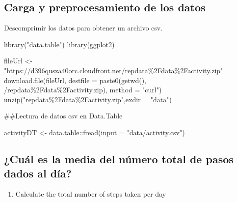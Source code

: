 \documentclass[
]{article}
\newenvironment{Shaded}{\begin{snugshade}}{\end{snugshade}}
\newcommand{\AttributeTok}[1]{\textcolor[rgb]{0.77,0.63,0.00}{#1}}
\newcommand{\FunctionTok}[1]{\textcolor[rgb]{0.00,0.00,0.00}{#1}}
\newcommand{\NormalTok}[1]{#1}
\newcommand{\OtherTok}[1]{\textcolor[rgb]{0.56,0.35,0.01}{#1}}
\newcommand{\SpecialCharTok}[1]{\textcolor[rgb]{0.00,0.00,0.00}{#1}}
\newcommand{\StringTok}[1]{\textcolor[rgb]{0.31,0.60,0.02}{#1}}
\providecommand{\tightlist}{%
  \setlength{\itemsep}{0pt}\setlength{\parskip}{0pt}}
\begin{document}
\hypertarget{carga-y-preprocesamiento-de-los-datos}{%
\subsection{Carga y preprocesamiento de los
datos}\label{carga-y-preprocesamiento-de-los-datos}}

Descomprimir los datos para obtener un archivo csv.

\begin{Shaded}
\begin{Highlighting}[]
\FunctionTok{library}\NormalTok{(}\StringTok{"data.table"}\NormalTok{)}
\FunctionTok{library}\NormalTok{(ggplot2)}

\NormalTok{fileUrl }\OtherTok{\textless{}{-}} \StringTok{"https://d396qusza40orc.cloudfront.net/repdata\%2Fdata\%2Factivity.zip"}
\FunctionTok{download.file}\NormalTok{(fileUrl, }\AttributeTok{destfile =} \FunctionTok{paste0}\NormalTok{(}\FunctionTok{getwd}\NormalTok{(), }\StringTok{\textquotesingle{}/repdata\%2Fdata\%2Factivity.zip\textquotesingle{}}\NormalTok{), }\AttributeTok{method =} \StringTok{"curl"}\NormalTok{)}
\FunctionTok{unzip}\NormalTok{(}\StringTok{"repdata\%2Fdata\%2Factivity.zip"}\NormalTok{,}\AttributeTok{exdir =} \StringTok{"data"}\NormalTok{)}
\end{Highlighting}
\end{Shaded}

\#\#Lectura de datos csv en Data.Table

\begin{Shaded}
\begin{Highlighting}[]
\NormalTok{activityDT }\OtherTok{\textless{}{-}}\NormalTok{ data.table}\SpecialCharTok{::}\FunctionTok{fread}\NormalTok{(}\AttributeTok{input =} \StringTok{"data/activity.csv"}\NormalTok{)}
\end{Highlighting}
\end{Shaded}

\hypertarget{cuuxe1l-es-la-media-del-nuxfamero-total-de-pasos-dados-al-duxeda}{%
\subsection{¿Cuál es la media del número total de pasos dados al
día?}\label{cuuxe1l-es-la-media-del-nuxfamero-total-de-pasos-dados-al-duxeda}}

\begin{enumerate}
\def\labelenumi{\arabic{enumi}.}
\tightlist
\item
  Calculate the total number of steps taken per day
\end{enumerate}
\end{document}
